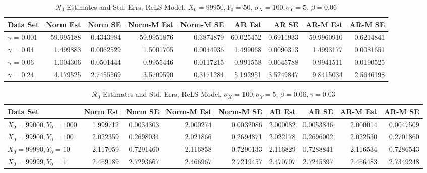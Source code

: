 \documentclass[12pt]{article}
\newcommand{\rr}{\ensuremath{\mathcal{R}_0}}
\begin{document}
\begin{table}[H]
	
	\caption{\label{tab:}$\rr$ Estimates and Std. Errs, ReLS Model,
		$X_0 = 99950, Y_0 = 50$, $\sigma_X = 100, \sigma_Y = 5$, $\beta = 0.06$}
	\centering
	\begin{footnotesize}
		\begin{tabular}[t]{l|r|r|r|r|r|r|r|r}
			\hline
			Data Set & Norm Est & Norm SE & Norm-M Est & Norm-M SE & AR Est & AR SE & AR-M Est & AR-M SE\\
			\hline
			$\gamma$ = 0.001 & 59.995188 & 0.4343984 & 59.9951876 & 0.3874879 & 60.025452 & 0.6911933 & 59.9960910 & 0.6214841\\
			\hline
			$\gamma$ = 0.04 & 1.499883 & 0.0062529 & 1.5001705 & 0.0044936 & 1.499068 & 0.0090313 & 1.4993177 & 0.0081651\\
			\hline
			$\gamma$ = 0.06 & 1.004306 & 0.0501444 & 0.9955446 & 0.0117215 & 0.991558 & 0.0645788 & 0.9941511 & 0.0190525\\
			\hline
			$\gamma$ = 0.24 & 4.179525 & 2.7455569 & 3.5709590 & 0.3171284 & 5.192951 & 3.5249847 & 9.8415034 & 2.5646198\\
			\hline
		\end{tabular}
	\end{footnotesize}
\end{table}

\begin{table}[H]
	
	\caption{\label{tab:}$\rr$ Estimates and Std. Errs, ReLS Model,
		$\sigma_X = 100, \sigma_Y = 5$, $\beta = 0.06, \gamma = 0.03$}
	\centering
	\begin{footnotesize}
		\begin{tabular}[t]{l|r|r|r|r|r|r|r|r}
			\hline
			Data Set & Norm Est & Norm SE & Norm-M Est & Norm-M SE & AR Est & AR SE & AR-M Est & AR-M SE\\
			\hline
			$X_0 = 99000, Y_0 = 1000$ & 1.999712 & 0.0034303 & 2.000274 & 0.0032086 & 2.000082 & 0.0053846 & 2.000014 & 0.0047509\\
			\hline
			$X_0 = 99900, Y_0 = 100$ & 2.022359 & 0.2698034 & 2.021866 & 0.2694871 & 2.022178 & 0.2696002 & 2.022530 & 0.2701860\\
			\hline
			$X_0 = 99990, Y_0 = 10$ & 2.117059 & 0.7291460 & 2.116858 & 0.7290133 & 2.116829 & 0.7288841 & 2.116534 & 0.7286543\\
			\hline
			$X_0 = 99999, Y_0 = 1$  & 2.469189 & 2.7293667 & 2.466967 & 2.7219457 & 2.470707 & 2.7245397 & 2.466483 & 2.7349248\\
			\hline
		\end{tabular}
	\end{footnotesize}
\end{table}
\end{document}
